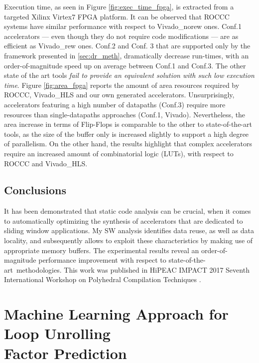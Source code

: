 \documentclass[]{usiinfthesis}
\newcommand{\SoTA}{{state-of-the-art}}
\begin{document}
Execution time, as seen in Figure \ref{fig:exec_time_fpga}, is extracted from 
a targeted Xilinx Virtex7 FPGA platform. 
It can be observed that ROCCC systems have similar
performance with respect to Vivado\_norew ones. Conf.1 accelerators 
--- even though they do not require code modifications --- are as 
efficient as Vivado\_rew ones. Conf.2 and Conf. 3 that are
supported only by the framework presented in \ref{sec:dr_meth}, dramatically decrease
run-times, with an order-of-magnitude speed up on average between
Conf.1 and Conf.3. The other state of the art tools \emph{fail to 
provide an equivalent solution with such low execution time}.
Figure \ref{fig:area_fpga} reports the amount of area resources required by
ROCCC, Vivado\_HLS and our own generated accelerators.
Unsurprisingly, accelerators featuring a high number of datapaths (Conf.3) 
require more resources than single-datapaths approaches (Conf.1, Vivado). 
Nevertheless, the area increase in terms of Flip-Flops is comparable to 
the other to state-of-the-art tools, as the size of the buffer only is 
increased slightly to support a high degree of parallelism.
On the other hand, the results highlight that complex accelerators require 
an increased amount of combinatorial logic (LUTs), with respect to ROCCC 
and Vivado\_HLS.

\vspace{-0.3cm}
\subsection{Conclusions}

It has been demonstrated that static code analysis can be crucial, when it comes to 
automatically optimizing the synthesis of accelerators that are dedicated to 
sliding window applications. My SW analysis identifies data reuse, as well as data locality,
and subsequently allows to exploit these characteristics by making use of appropriate
memory buffers. The experimental results reveal an order-of-magnitude performance 
improvement with respect to \SoTA\ methodologies. This work was published in 
HiPEAC IMPACT 2017 Seventh International Workshop on Polyhedral Compilation Techniques 
\cite{ZacharopoulosJan17}. 

%

\section[Machine Learning Approach for Loop Unrolling\\ Factor Prediction]
{Machine Learning Approach for Loop Unrolling\\ Factor Prediction}
\end{document}
